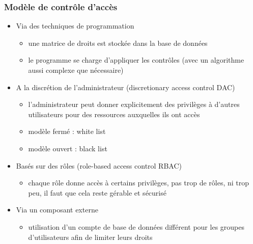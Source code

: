 \documentclass{beamer}
\begin{document}
\begin{frame}
  \frametitle{Modèle de contrôle d'accès}
  \begin{itemize}
    \item Via des techniques de programmation
    \begin{itemize}
      \item une matrice de droits est stockée dans la base de données 
      \item le programme se charge d'appliquer les contrôles (avec un algorithme aussi complexe que nécessaire)
    \end{itemize}
    \item A la discrétion de l'administrateur (discretionary access control DAC)
    \begin{itemize}
      \item l'administrateur peut donner explicitement des privilèges à d'autres utilisateurs pour des ressources auxquelles ils ont accès
      \item modèle fermé : white list
      \item modèle ouvert : black list
    \end{itemize}
    \item Basés sur des rôles (role-based access control RBAC)
    \begin{itemize}
      \item chaque rôle donne accès à certains privilèges, pas trop de rôles, ni trop peu, il faut que cela reste gérable et sécurisé
    \end{itemize}
    \item Via un composant externe
    \begin{itemize}
      \item utilisation d'un compte de base de données différent pour les groupes d'utilisateurs afin de limiter leurs droits
    \end{itemize}
  \end{itemize}
\end{frame}
\end{document}

